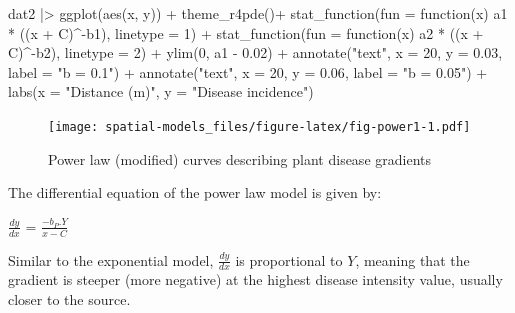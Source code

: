 \documentclass[
  letterpaper,
]{book}
\newenvironment{Shaded}{\begin{snugshade}}{\end{snugshade}}
\newcommand{\AttributeTok}[1]{\textcolor[rgb]{0.40,0.45,0.13}{#1}}
\newcommand{\ControlFlowTok}[1]{\textcolor[rgb]{0.00,0.23,0.31}{#1}}
\newcommand{\DecValTok}[1]{\textcolor[rgb]{0.68,0.00,0.00}{#1}}
\newcommand{\FloatTok}[1]{\textcolor[rgb]{0.68,0.00,0.00}{#1}}
\newcommand{\FunctionTok}[1]{\textcolor[rgb]{0.28,0.35,0.67}{#1}}
\newcommand{\NormalTok}[1]{\textcolor[rgb]{0.00,0.23,0.31}{#1}}
\newcommand{\SpecialCharTok}[1]{\textcolor[rgb]{0.37,0.37,0.37}{#1}}
\newcommand{\StringTok}[1]{\textcolor[rgb]{0.13,0.47,0.30}{#1}}
\begin{document}
\begin{Shaded}
\begin{Highlighting}[]
\NormalTok{dat2 }\SpecialCharTok{|\textgreater{}}
  \FunctionTok{ggplot}\NormalTok{(}\FunctionTok{aes}\NormalTok{(x, y)) }\SpecialCharTok{+}
  \FunctionTok{theme\_r4pde}\NormalTok{()}\SpecialCharTok{+}
  \FunctionTok{stat\_function}\NormalTok{(}\AttributeTok{fun =} \ControlFlowTok{function}\NormalTok{(x) a1 }\SpecialCharTok{*}\NormalTok{ ((x }\SpecialCharTok{+}\NormalTok{ C)}\SpecialCharTok{\^{}{-}}\NormalTok{b1), }\AttributeTok{linetype =} \DecValTok{1}\NormalTok{) }\SpecialCharTok{+}
  \FunctionTok{stat\_function}\NormalTok{(}\AttributeTok{fun =} \ControlFlowTok{function}\NormalTok{(x) a2 }\SpecialCharTok{*}\NormalTok{ ((x }\SpecialCharTok{+}\NormalTok{ C)}\SpecialCharTok{\^{}{-}}\NormalTok{b2), }\AttributeTok{linetype =} \DecValTok{2}\NormalTok{) }\SpecialCharTok{+}
  \FunctionTok{ylim}\NormalTok{(}\DecValTok{0}\NormalTok{, a1 }\SpecialCharTok{{-}} \FloatTok{0.02}\NormalTok{) }\SpecialCharTok{+}
  \FunctionTok{annotate}\NormalTok{(}\StringTok{"text"}\NormalTok{, }\AttributeTok{x =} \DecValTok{20}\NormalTok{, }\AttributeTok{y =} \FloatTok{0.03}\NormalTok{, }\AttributeTok{label =} \StringTok{"b = 0.1"}\NormalTok{) }\SpecialCharTok{+}
  \FunctionTok{annotate}\NormalTok{(}\StringTok{"text"}\NormalTok{, }\AttributeTok{x =} \DecValTok{20}\NormalTok{, }\AttributeTok{y =} \FloatTok{0.06}\NormalTok{, }\AttributeTok{label =} \StringTok{"b = 0.05"}\NormalTok{) }\SpecialCharTok{+}
  \FunctionTok{labs}\NormalTok{(}\AttributeTok{x =} \StringTok{"Distance (m)"}\NormalTok{, }\AttributeTok{y =} \StringTok{"Disease incidence"}\NormalTok{)}
\end{Highlighting}
\end{Shaded}

\begin{figure}

\texttt{[image: spatial-models\_files/figure-latex/fig-power1-1.pdf]} \hfill{}

\caption{\label{fig-power1}Power law (modified) curves describing plant
disease gradients}

\end{figure}

The differential equation of the power law model is given by:

\(\frac{dy}{dx}\) = \(\frac{-b_{P}.Y}{x - C}\)

Similar to the exponential model, \(\frac{dy}{dx}\) is proportional to
\(Y\), meaning that the gradient is steeper (more negative) at the
highest disease intensity value, usually closer to the source.
\end{document}
